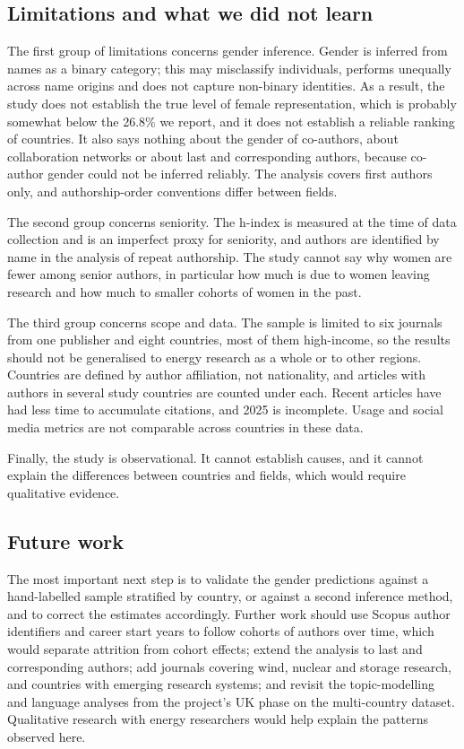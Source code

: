 \documentclass[preprint,12pt,number]{elsarticle}
\begin{document}
\subsection{Limitations and what we did not learn}

The first group of limitations concerns gender inference. Gender is inferred from names as a binary category; this may misclassify individuals, performs unequally across name origins and does not capture non-binary identities. As a result, the study does not establish the true level of female representation, which is probably somewhat below the 26.8\% we report, and it does not establish a reliable ranking of countries. It also says nothing about the gender of co-authors, about collaboration networks or about last and corresponding authors, because co-author gender could not be inferred reliably. The analysis covers first authors only, and authorship-order conventions differ between fields.

The second group concerns seniority. The h-index is measured at the time of data collection and is an imperfect proxy for seniority, and authors are identified by name in the analysis of repeat authorship. The study cannot say why women are fewer among senior authors, in particular how much is due to women leaving research and how much to smaller cohorts of women in the past.

The third group concerns scope and data. The sample is limited to six journals from one publisher and eight countries, most of them high-income, so the results should not be generalised to energy research as a whole or to other regions. Countries are defined by author affiliation, not nationality, and articles with authors in several study countries are counted under each. Recent articles have had less time to accumulate citations, and 2025 is incomplete. Usage and social media metrics are not comparable across countries in these data.

Finally, the study is observational. It cannot establish causes, and it cannot explain the differences between countries and fields, which would require qualitative evidence.

\subsection{Future work}

The most important next step is to validate the gender predictions against a hand-labelled sample stratified by country, or against a second inference method, and to correct the estimates accordingly. Further work should use Scopus author identifiers and career start years to follow cohorts of authors over time, which would separate attrition from cohort effects; extend the analysis to last and corresponding authors; add journals covering wind, nuclear and storage research, and countries with emerging research systems; and revisit the topic-modelling and language analyses from the project's UK phase on the multi-country dataset. Qualitative research with energy researchers would help explain the patterns observed here.
\end{document}
